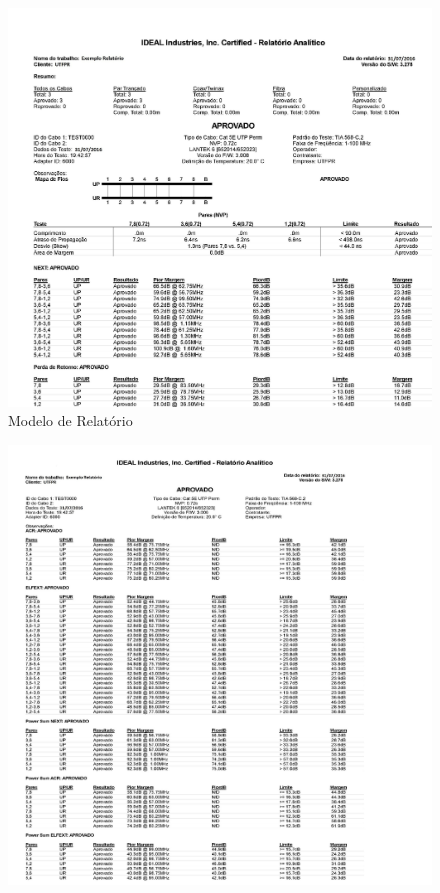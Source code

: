\documentclass[	DIV=calc,%
							paper=a4,%
							fontsize=12pt,%
							onecolumn]{scrartcl}	 					%
\begin{document}
\begin{figure}[!h]
	\centering
	\caption{Modelo de Relatório}
	\includegraphics{relat_1}
\end{figure}
\begin{figure}[!h]
	\centering
	\includegraphics{relat_2}
\end{figure}
\end{document}
